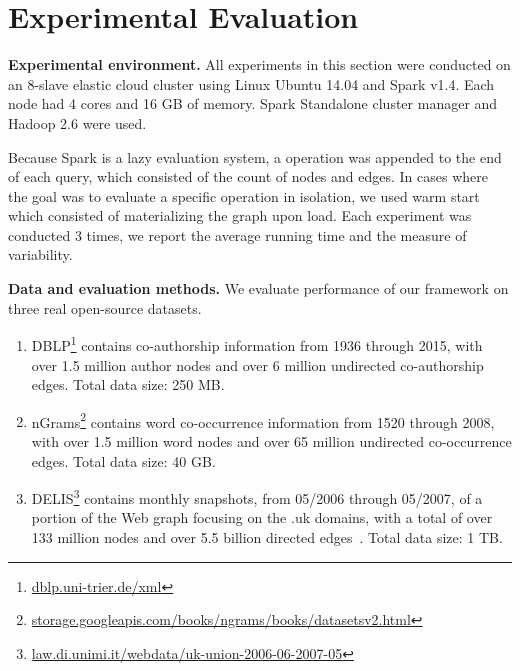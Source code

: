 \section{Experimental Evaluation}
\label{sec:exp}

{\bf Experimental environment.} All experiments in this section were
conducted on an 8-slave elastic cloud cluster using Linux Ubuntu 14.04
and Spark v1.4.  Each node had 4 cores and 16 GB of memory.  Spark
Standalone cluster manager and Hadoop 2.6 were used.

Because Spark is a lazy evaluation system, a 
operation was appended to the end of each query, which consisted of
the count of nodes and edges.  In cases where the goal was to evaluate
a specific operation in isolation, we used warm start which consisted
of materializing the graph upon load.  Each experiment was conducted 3
times, we report the average running time and the measure of
variability.

{\bf Data and evaluation methods.}  We evaluate performance of our
framework on three real open-source datasets.  

\begin{enumerate}

\item DBLP\footnote{\url{dblp.uni-trier.de/xml}} contains
  co-authorship information from 1936 through 2015, with over 1.5
  million author nodes and over 6 million undirected co-authorship
  edges.  Total data size: 250 MB.

\item nGrams\footnote{\url{storage.googleapis.com/books/ngrams/books/datasetsv2.html}}
  contains word co-occurrence information from 1520 through 2008, with
  over 1.5 million word nodes and over 65 million undirected
  co-occurrence edges.  Total data size: 40 GB.

\item
  DELIS\footnote{\url{law.di.unimi.it/webdata/uk-union-2006-06-2007-05}}
  contains monthly snapshots, from 05/2006 through 05/2007, of a
  portion of the Web graph focusing on the .uk domains, with a total
  of over 133 million nodes and over 5.5 billion directed
  edges~\cite{BSVLTAG}.  Total data size: 1 TB.

\end{enumerate}

